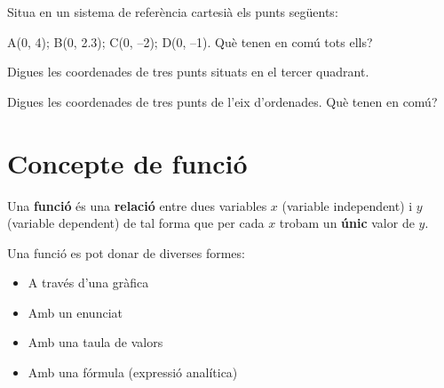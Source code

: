 \begin{mylist}
\vspace{2cm}
\exer  Situa en un sistema de referència cartesià els punts següents: 

A(0, 4); B(0, 2.3); C(0, --2); D(0, --1). Què tenen en comú tots ells?


\exer \mental Digues les coordenades de tres punts situats en el tercer quadrant.


\exer  \mental Digues les coordenades de tres punts de l'eix d'ordenades. Què tenen en comú? 


\end{mylist}



\section{Concepte de funció}


\begin{theorybox}
 Una \textbf{funció} és una \textbf{relació} entre dues variables $x$ (variable independent) i $y$ (variable dependent) de tal forma que per cada $x$ trobam un \textbf{únic} valor de $y$.

 Una funció es pot donar de diverses formes:
\begin{itemize}
	\item A través d'una gràfica 
	\item Amb un enunciat 
	\item Amb una taula de valors
	\item Amb una fórmula (expressió analítica)
\end{itemize}
\end{theorybox}


